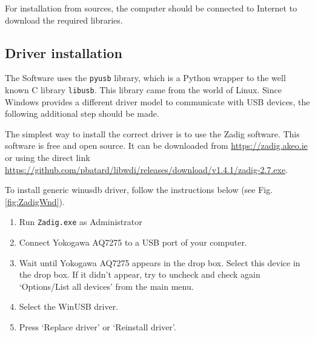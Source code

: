 For installation from sources, the computer should be connected to Internet to download the required libraries.





\subsection{Driver installation}

The Software uses the \texttt{pyusb} library, which is a Python wrapper to the well known C library \texttt{libusb}. This library came from the world of Linux. Since Windows provides a different driver model to communicate with USB devices, the following additional step should be made.


The simplest way to install the correct driver is to use the Zadig software. This software is free and open source. It can be downloaded from 
\url{https://zadig.akeo.ie}
or using the direct link
\url{https://github.com/pbatard/libwdi/releases/download/v1.4.1/zadig-2.7.exe}.


To install generic winusdb driver, follow the instructions below (see Fig. \ref{fig:ZadigWnd}).
\begin{enumerate}
	\item Run \texttt{Zadig.exe} as Administrator
	\item Connect Yokogawa AQ7275 to a USB port of your computer. 
	\item Wait until Yokogawa AQ7275 appears in the drop box. Select this device in the drop box. If it didn't appear, try to uncheck and check again `Options/List all devices' from the main menu.
	\item Select the WinUSB driver. %
	\item Press `Replace driver' or `Reinstall driver'.
\end{enumerate}

